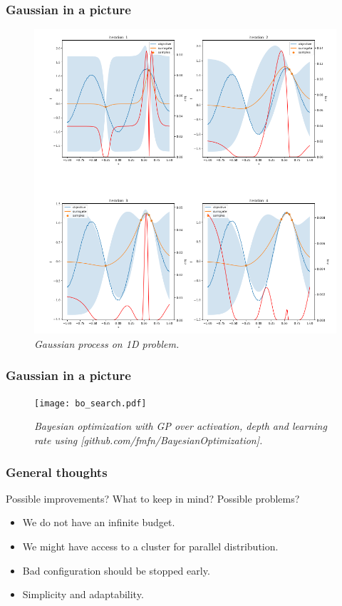 \documentclass{beamer}
\newcommand{\bi}{\begin{itemize}}
\newcommand{\ei}{\end{itemize}}
\begin{document}
\begin{frame}
\frametitle{Gaussian in a picture}
\begin{figure}[t]
	\centering
	\includegraphics[scale=0.25]{gp_bo.png}
	\caption{\it Gaussian process on 1D problem.}
	\label{fig:bo1d}
\end{figure}
\end{frame}

\begin{frame}
\frametitle{Gaussian in a picture}
\begin{figure}[t]
	\centering
	\texttt{[image: bo\_search.pdf]}
	\caption{\it Bayesian optimization with GP over activation, depth and learning rate using {\color{blue}[github.com/fmfn/BayesianOptimization]}.}
	\label{fig:bo}
\end{figure}
\end{frame}

\begin{frame}
\frametitle{General thoughts}

Possible improvements? What to keep in mind? Possible problems? \pause
\bi
\item We do not have an infinite budget. 
\item We might have access to a cluster for parallel distribution.
\item Bad configuration should be stopped early.
\item Simplicity and adaptability.
\ei
\end{frame}
\end{document}
